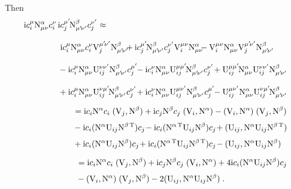 Then
\begin{align}
\begin{split}
        \im c_i^\mu \rmN^\alpha_{\mu\nu} c_i^\nu \, &
        \im c_j^ \mup \rmN^\beta_{\mup\nup}   c_j^\nup
        \approx \\[8pt]
        &\;\im c_i^\mu \rmN^\alpha_{\mu\nu} c_i^\nu  \rmV_{j}^{ \mup \nup}\rmN^\beta_{\mup\nup}  \!\!\!
        +   \im  c_j^ \mup  \rmN^\beta_{\mup\nup}  c_j^\nup  \rmV_{i}^{\mu\nu}\rmN^\alpha_{\mu\nu}  \!\!\!
        - \rmV_{i}^{\mu\nu}  \rmN^\alpha_{\mu\nu}  \rmV_{j}^{ \mup \nup}  \rmN^\beta_{\mup\nup}  \\[8pt]
        &- \im c_i^\mu \rmN^\alpha_{\mu\nu} \rmU_{i j }^{\nu\nup}  \rmN^\beta_{\mup\nup} c_j^\mup    \!
        - \im  c_i^\nu \rmN^\alpha_{\mu\nu}   \rmU_{ij}^{\mu \mup } \rmN^\beta_{\mup\nup} c_j^\nup \!
        + \rmU_{ij}^{\mu \mup }\rmN^\alpha_{\mu\nu}  \rmU_{i j }^{\nu\nup}  \rmN^\beta_{\mup\nup}
        \\[8pt]
        &+ \im c_i^\mu \rmN^\alpha_{\mu\nu} \rmU_{ij}^{\nu \mup }\rmN^\beta_{\mup\nup}  c_j^\nup    \!
        +  \im  c_i^\nu \rmN^\alpha_{\mu\nu}   \rmU_{ij}^{\mu\nup}\rmN^\beta_{\mup\nup}  c_j^ \mup  \!
        -  \rmU_{ij}^{\mu\nup} \rmN^\alpha_{\mu\nu}  \rmU_{ij}^{\nu \mup }\rmN^\beta_{\mup\nup}
\end{split}\\[6pt]
\begin{split}
        &=
        \im c_i \rmN^\alpha  c_i  \; ( \rmV_{j} , \rmN^\beta )
        + \im c_j \rmN^\beta  c_j  \; ( \rmV_{i} , \rmN^\alpha )
        - ( \rmV_{i} , \rmN^\alpha )\;( \rmV_{j} , \rmN^\beta )   \\[3pt]
        &- \im c_i ( \rmN^\alpha \rmU_{ij} \rmN^{\beta \, \T} ) c_j   \!
        -  \im c_i ( \rmN^{\alpha\, \T} \rmU_{ij} \rmN^{\beta } ) c_j  \!
        + (  \rmU_{ij}  , \rmN^\alpha \rmU_{ij} \rmN^{\beta\, \T} )
        \\[3pt]
        &+ \im c_i ( \rmN^\alpha \rmU_{ij} \rmN^\beta ) c_j   \!
        +  \im c_i ( \rmN^{\alpha\, \T} \rmU_{ij} \rmN^{\beta \, \T} ) c_j  \!
        - (  \rmU_{ij}  , \rmN^\alpha \rmU_{ij} \rmN^\beta )
\end{split}\\[6pt]
\begin{split}
        &=
        \im c_i \rmN^\alpha  c_i  \; ( \rmV_{j} , \rmN^\beta )
        + \im c_j \rmN^\beta  c_j  \; ( \rmV_{i} , \rmN^\alpha )
        + 4 \im c_i ( \rmN^\alpha \rmU_{ij} \rmN^\beta ) c_j  \\[3pt]
        &- ( \rmV_{i} , \rmN^\alpha )\;( \rmV_{j} , \rmN^\beta )
        - 2(  \rmU_{ij}  , \rmN^\alpha \rmU_{ij} \rmN^\beta )  \; .
\end{split}
\end{align}
